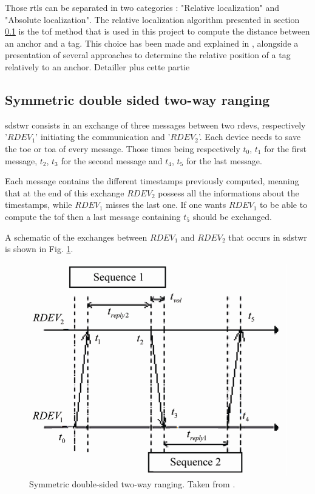 Those \gls{rtls} can be separated in two categories : "Relative localization" and "Absolute localization". The relative localization algorithm presented in section \ref{sds2wr} is the \gls{tof} method that is used in this project to compute the distance between an anchor and a tag. This choice has been made and explained in \cite{fesler2018high}, \cite{hannotier2019indoor} alongside a presentation of several approaches to determine the relative position of a tag relatively to an anchor. \color{red} Detailler plus cette partie \color{black}

\subsection{Symmetric double sided two-way ranging}
\label{sds2wr}

\gls{sdstwr} consists in an exchange of three messages between two \glspl{rdev}, respectively '$RDEV_1$' initiating the communication and '$RDEV_2$'. Each device needs to save the \gls{toe} or \gls{toa} of every message. Those times being respectively $t_0$, $t_1$ for the first message, $t_2$, $t_3$ for the second message and $t_4$, $t_5$ for the last message.
\vspace{2mm}

Each message contains the different timestamps previously computed, meaning that at the end of this exchange $RDEV_2$ possess all the informations about the timestamps, while $RDEV_1$ misses the last one. If one wants $RDEV_1$ to be able to compute the \gls{tof} then a last message containing $t_5$ should be exchanged.
\vspace{2mm}

A schematic of the exchanges between $RDEV_1$ and $RDEV_2$ that occurs in \gls{sdstwr} is shown in Fig. \ref{sdstwr}. 

\begin{figure}[H]
\centering
\includegraphics[width=.6\linewidth]{Images/sds-twr.png}
\caption{Symmetric double-sided two-way ranging. Taken from \cite{dalce2011comparison}.}
\label{sdstwr}
\end{figure}

